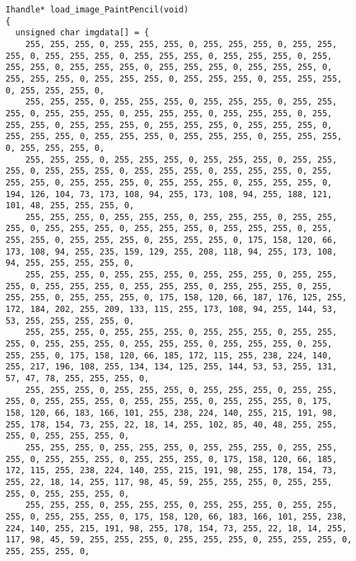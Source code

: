 \documentclass{ctexart}
\begin{document}
\begin{lstlisting}
Ihandle* load_image_PaintPencil(void)
{
  unsigned char imgdata[] = {
    255, 255, 255, 0, 255, 255, 255, 0, 255, 255, 255, 0, 255, 255, 255, 0, 255, 255, 255, 0, 255, 255, 255, 0, 255, 255, 255, 0, 255, 255, 255, 0, 255, 255, 255, 0, 255, 255, 255, 0, 255, 255, 255, 0, 255, 255, 255, 0, 255, 255, 255, 0, 255, 255, 255, 0, 255, 255, 255, 0, 255, 255, 255, 0,
    255, 255, 255, 0, 255, 255, 255, 0, 255, 255, 255, 0, 255, 255, 255, 0, 255, 255, 255, 0, 255, 255, 255, 0, 255, 255, 255, 0, 255, 255, 255, 0, 255, 255, 255, 0, 255, 255, 255, 0, 255, 255, 255, 0, 255, 255, 255, 0, 255, 255, 255, 0, 255, 255, 255, 0, 255, 255, 255, 0, 255, 255, 255, 0,
    255, 255, 255, 0, 255, 255, 255, 0, 255, 255, 255, 0, 255, 255, 255, 0, 255, 255, 255, 0, 255, 255, 255, 0, 255, 255, 255, 0, 255, 255, 255, 0, 255, 255, 255, 0, 255, 255, 255, 0, 255, 255, 255, 0, 194, 126, 104, 73, 173, 108, 94, 255, 173, 108, 94, 255, 188, 121, 101, 48, 255, 255, 255, 0,
    255, 255, 255, 0, 255, 255, 255, 0, 255, 255, 255, 0, 255, 255, 255, 0, 255, 255, 255, 0, 255, 255, 255, 0, 255, 255, 255, 0, 255, 255, 255, 0, 255, 255, 255, 0, 255, 255, 255, 0, 175, 158, 120, 66, 173, 108, 94, 255, 235, 159, 129, 255, 208, 118, 94, 255, 173, 108, 94, 255, 255, 255, 255, 0,
    255, 255, 255, 0, 255, 255, 255, 0, 255, 255, 255, 0, 255, 255, 255, 0, 255, 255, 255, 0, 255, 255, 255, 0, 255, 255, 255, 0, 255, 255, 255, 0, 255, 255, 255, 0, 175, 158, 120, 66, 187, 176, 125, 255, 172, 184, 202, 255, 209, 133, 115, 255, 173, 108, 94, 255, 144, 53, 53, 255, 255, 255, 255, 0,
    255, 255, 255, 0, 255, 255, 255, 0, 255, 255, 255, 0, 255, 255, 255, 0, 255, 255, 255, 0, 255, 255, 255, 0, 255, 255, 255, 0, 255, 255, 255, 0, 175, 158, 120, 66, 185, 172, 115, 255, 238, 224, 140, 255, 217, 196, 108, 255, 134, 134, 125, 255, 144, 53, 53, 255, 131, 57, 47, 78, 255, 255, 255, 0,
    255, 255, 255, 0, 255, 255, 255, 0, 255, 255, 255, 0, 255, 255, 255, 0, 255, 255, 255, 0, 255, 255, 255, 0, 255, 255, 255, 0, 175, 158, 120, 66, 183, 166, 101, 255, 238, 224, 140, 255, 215, 191, 98, 255, 178, 154, 73, 255, 22, 18, 14, 255, 102, 85, 40, 48, 255, 255, 255, 0, 255, 255, 255, 0,
    255, 255, 255, 0, 255, 255, 255, 0, 255, 255, 255, 0, 255, 255, 255, 0, 255, 255, 255, 0, 255, 255, 255, 0, 175, 158, 120, 66, 185, 172, 115, 255, 238, 224, 140, 255, 215, 191, 98, 255, 178, 154, 73, 255, 22, 18, 14, 255, 117, 98, 45, 59, 255, 255, 255, 0, 255, 255, 255, 0, 255, 255, 255, 0,
    255, 255, 255, 0, 255, 255, 255, 0, 255, 255, 255, 0, 255, 255, 255, 0, 255, 255, 255, 0, 175, 158, 120, 66, 183, 166, 101, 255, 238, 224, 140, 255, 215, 191, 98, 255, 178, 154, 73, 255, 22, 18, 14, 255, 117, 98, 45, 59, 255, 255, 255, 0, 255, 255, 255, 0, 255, 255, 255, 0, 255, 255, 255, 0,

\end{lstlisting}
\end{document}
